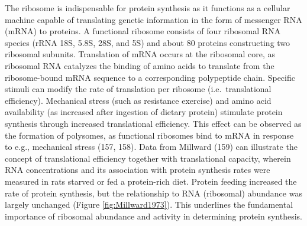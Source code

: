 \documentclass[twoside,10pt]{gihclass} %
\begin{document}
The ribosome is indispensable for protein synthesis as it functions as a cellular machine capable of translating genetic information in the form of messenger RNA (mRNA) to proteins.
A functional ribosome consists of four ribosomal RNA species (rRNA 18S, 5.8S, 28S, and 5S) and about 80 proteins constructing two ribosomal subunits. Translation of mRNA occurs at the ribosomal core, as ribosomal RNA catalyzes the binding of amino acids to translate from the ribosome-bound mRNA sequence to a corresponding polypeptide chain.
Specific stimuli can modify the rate of translation per ribosome (i.e.~translational efficiency).
Mechanical stress (such as resistance exercise) and amino acid availability (as increased after ingestion of dietary protein) stimulate protein synthesis through increased translational efficiency.
This effect can be observed as the formation of polysomes, as functional ribosomes bind to mRNA in response to e.g., mechanical stress
(157, 158).
Data from Millward (159) can illustrate the concept of translational efficiency together with translational capacity,
wherein RNA concentrations and its association with protein synthesis rates were measured in rats starved or fed a protein-rich diet.
Protein feeding increased the rate of protein synthesis, but the relationship to RNA (ribosomal) abundance was largely unchanged (Figure \ref{fig:Millward1973}). This underlines the fundamental importance of ribosomal abundance and activity in determining protein synthesis.
\end{document}

